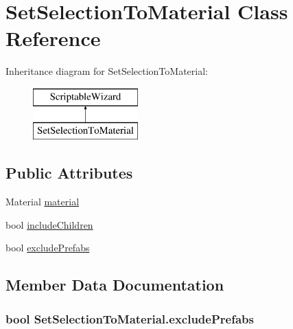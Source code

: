 \hypertarget{class_set_selection_to_material}{}\section{Set\+Selection\+To\+Material Class Reference}
\label{class_set_selection_to_material}
Inheritance diagram for Set\+Selection\+To\+Material\+:\begin{figure}[H]
\begin{center}
\leavevmode
\includegraphics[height=2.000000cm]{class_set_selection_to_material}
\end{center}
\end{figure}
\subsection*{Public Attributes}
\begin{DoxyCompactItemize}
\item 
Material \hyperlink{class_set_selection_to_material_ab017fca0bbb5ec03ca059b926cd894bf}{material}
\item 
bool \hyperlink{class_set_selection_to_material_a495b433f7c0a652fa371258946b21a42}{include\+Children}
\item 
bool \hyperlink{class_set_selection_to_material_af55b791f383e5183f1fc09e0b9535011}{exclude\+Prefabs}
\end{DoxyCompactItemize}


\subsection{Member Data Documentation}
\subsubsection[{\texorpdfstring{exclude\+Prefabs}{excludePrefabs}}]{\setlength{\rightskip}{0pt plus 5cm}bool Set\+Selection\+To\+Material.\+exclude\+Prefabs}\hypertarget{class_set_selection_to_material_af55b791f383e5183f1fc09e0b9535011}{}\label{class_set_selection_to_material_af55b791f383e5183f1fc09e0b9535011}
